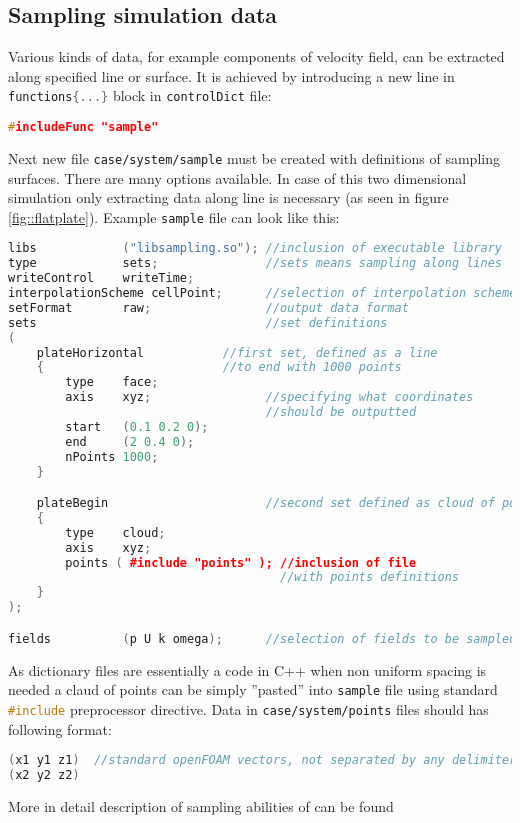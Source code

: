         \subsection{Sampling simulation data}
            Various kinds of data, for example components of velocity field, can be extracted along specified line or surface. It is achieved by introducing a new line in \lstinline[language=C++]|functions{...}| block in \texttt{controlDict} file:
            \begin{lstlisting}[language=C++]
#includeFunc "sample"
            \end{lstlisting}
            Next new file \texttt{case/system/sample} must be created with definitions of sampling surfaces. There are many options available. In case of this two dimensional simulation only extracting data along line is necessary (as seen in figure \ref{fig::flatplate}). Example \texttt{sample} file can look like this:
            \begin{lstlisting}[language=C++]
libs            ("libsampling.so"); //inclusion of executable library
type            sets;               //sets means sampling along lines
writeControl    writeTime;          
interpolationScheme cellPoint;      //selection of interpolation scheme
setFormat       raw;                //output data format
sets                                //set definitions
(
    plateHorizontal           //first set, defined as a line  
    {                         //to end with 1000 points
        type    face;
        axis    xyz;                //specifying what coordinates 
                                    //should be outputted
        start   (0.1 0.2 0);
        end     (2 0.4 0);
        nPoints 1000;
    }

    plateBegin                      //second set defined as cloud of points
    {
        type    cloud;
        axis    xyz;
        points ( #include "points" ); //inclusion of file 
                                      //with points definitions
    }
);

fields          (p U k omega);      //selection of fields to be sampled
            \end{lstlisting}
            As dictionary files are essentially a code in C++ when non uniform spacing is needed a claud of points can be simply ''pasted'' into \texttt{sample} file using standard \lstinline[language=C++]{#include} preprocessor directive.
            Data in \texttt{case/system/points} files should has following format:
            \begin{lstlisting}[language=C++]
(x1 y1 z1)  //standard openFOAM vectors, not separated by any delimiter
(x2 y2 z2)
            \end{lstlisting}
            More in detail description of sampling abilities of \oFoam can be found~\cite{sampl}
